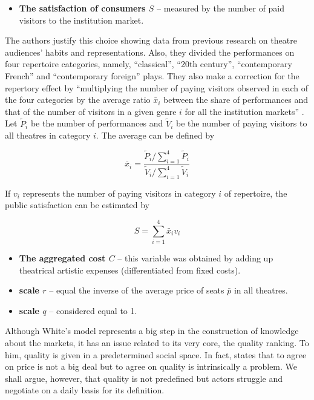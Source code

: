 \documentclass[a4paper, 12pt, openright, oneside, german, french, brazil, english]{abntex2}
\begin{document}
	\begin{itemize}
		\item \textbf{The satisfaction of consumers $S$} -- measured by the number of paid visitors to the institution market.
	\end{itemize}
	
	The authors justify this choice showing data from previous research on theatre audiences' habits and representations. Also, they divided the performances on four repertoire categories, namely, ``classical'', ``20th century'', ``contemporary French'' and ``contemporary foreign'' plays. They also make a correction for the repertory effect by ``multiplying the number of paying visitors observed  in each of the four categories by the average ratio $\bar{x}_i$ between the share of performances and that of the number of visitors in a given genre $i$ for all the institution markets'' \cite[p. 265]{biencourt2002market}. Let $\tilde{P}_i$ be the number of performances and $\tilde{V}_i$ be the number of paying visitors to all theatres in category $i$. The average can be defined by
	
	\begin{equation}
	\label{repertory-effect-correction}
		\bar{x}_i = \frac{\tilde{P}_i / \sum_{i=1}^{4}\tilde{P}_i}{\tilde{V}_i / \sum_{i=1}^{4}\tilde{V}_i}	
	\end{equation}
	
	If $v_i$ represents the number of paying visitors in category $i$ of repertoire, the public satisfaction can be estimated by
	
	\begin{equation}
	\label{satisfaction-corrected}
		S = \sum_{i=1}^{4}\bar{x}_i v_i
	\end{equation}
	
	
	
	\begin{itemize}
		\item \textbf{The aggregated cost $C$} -- this variable was obtained by adding up theatrical artistic expenses (differentiated from fixed costs).
		
		\item \textbf{scale $r$} -- equal the inverse of the average price of seats $\bar{p}$ in all theatres.
		
		\item \textbf{scale $q$} -- considered equal to 1.
	\end{itemize}



        Although White's model represents a big step in the construction of knowledge about the markets, it has an issue related to its very core, the quality ranking. To him, quality is given in a predetermined social space. In fact,  states that to agree on price is not a big deal but to agree on quality is intrinsically a problem. We shall argue, however, that quality is not predefined but actors struggle and negotiate on a daily basis for its definition.
\end{document}
